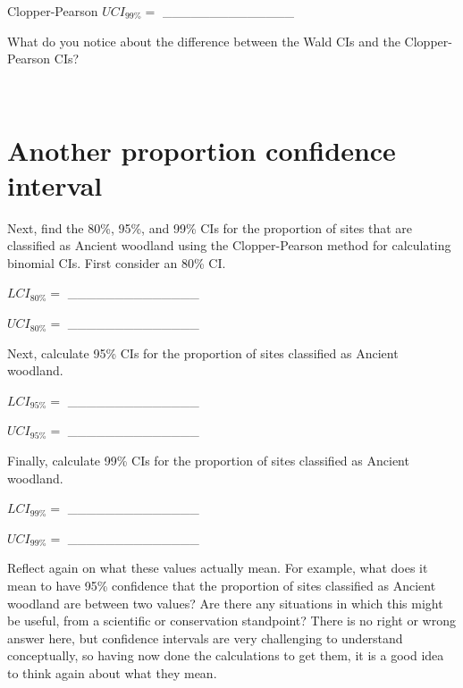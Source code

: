 \documentclass[
  openany]{scrbook}
\begin{document}
Clopper-Pearson \(UCI_{99\%} =\) \_\_\_\_\_\_\_\_\_\_\_\_\_\_

What do you notice about the difference between the Wald CIs and the Clopper-Pearson CIs?

\begin{verbatim}


\end{verbatim}

\hypertarget{another-proportion-confidence-interval}{%
\section{Another proportion confidence interval}\label{another-proportion-confidence-interval}}

Next, find the 80\%, 95\%, and 99\% CIs for the proportion of sites that are classified as Ancient woodland using the Clopper-Pearson method for calculating binomial CIs.
First consider an 80\% CI.

\(LCI_{80\%} =\) \_\_\_\_\_\_\_\_\_\_\_\_\_\_

\(UCI_{80\%} =\) \_\_\_\_\_\_\_\_\_\_\_\_\_\_

Next, calculate 95\% CIs for the proportion of sites classified as Ancient woodland.

\(LCI_{95\%} =\) \_\_\_\_\_\_\_\_\_\_\_\_\_\_

\(UCI_{95\%} =\) \_\_\_\_\_\_\_\_\_\_\_\_\_\_

Finally, calculate 99\% CIs for the proportion of sites classified as Ancient woodland.

\(LCI_{99\%} =\) \_\_\_\_\_\_\_\_\_\_\_\_\_\_

\(UCI_{99\%} =\) \_\_\_\_\_\_\_\_\_\_\_\_\_\_

Reflect again on what these values actually mean.
For example, what does it mean to have 95\% confidence that the proportion of sites classified as Ancient woodland are between two values?
Are there any situations in which this might be useful, from a scientific or conservation standpoint?
There is no right or wrong answer here, but confidence intervals are very challenging to understand conceptually, so having now done the calculations to get them, it is a good idea to think again about what they mean.

\begin{verbatim}








\end{verbatim}
\end{document}
